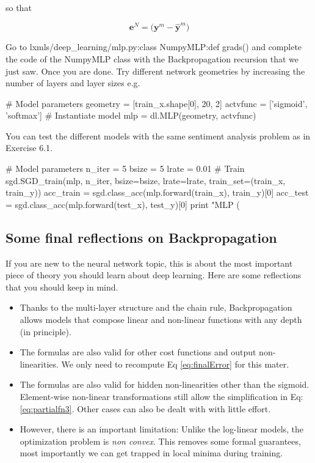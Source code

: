 \noindent so that

\begin{equation}
\mathbf{e}^N =\Big(\mathbf{y}^m - \hat{\mathbf{y}}^m \Big)  
\end{equation}

\begin{exercise}
Go to lxmls/deep\_learning/mlp.py:class NumpyMLP:def grads() and complete the
code of the NumpyMLP class with the Backpropagation recursion that we just saw.
Once you are done. Try different network geometries by increasing the number of
layers and layer sizes e.g.
\begin{python}
# Model parameters
geometry = [train_x.shape[0], 20, 2]
actvfunc = ['sigmoid', 'softmax'] 
# Instantiate model
mlp      = dl.MLP(geometry, actvfunc) 
\end{python}
You can test the different models with the same sentiment analysis problem as
in Exercise 6.1. 
\begin{python}
# Model parameters
n_iter = 5
bsize  = 5
lrate  = 0.01
# Train
sgd.SGD_train(mlp, n_iter, bsize=bsize, lrate=lrate, train_set=(train_x, train_y))
acc_train = sgd.class_acc(mlp.forward(train_x), train_y)[0]
acc_test  = sgd.class_acc(mlp.forward(test_x), test_y)[0]
print "MLP (%
\end{python}
\end{exercise}

\subsection{Some final reflections on Backpropagation}

If you are new to the neural network topic, this is about the most important
piece of theory you should learn about deep learning. Here are some reflections
that you should keep in mind.

\begin{itemize}
\item Thanks to the multi-layer structure and the chain rule, Backpropagation allows models that compose linear and non-linear functions with any depth (in principle\footnotemark). 
\item The formulas are also valid for other cost functions and output non-linearities. We only need to recompute Eq \ref{eq:finalError} for this mater.  
\item The formulas are also valid for hidden non-linearities other than the sigmoid. Element-wise non-linear transformations still allow the simplification in Eq: \ref{eq:partialfn3}. Other cases can also be dealt with with little effort.
\item However, there is an important limitation: Unlike the log-linear models, the optimization problem is \textit{non convex}. This removes some formal guarantees, most importantly we can get trapped in local minima during training.
\end{itemize}


